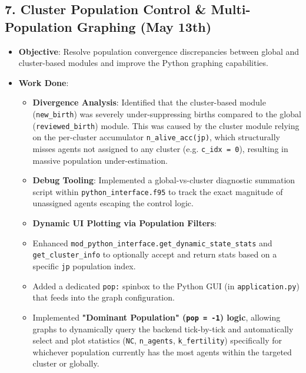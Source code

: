 \subsection{7. Cluster Population Control \& Multi-Population Graphing (May 13th)}
\begin{itemize}
\item \textbf{Objective}: Resolve population convergence discrepancies between global and cluster-based modules and improve the Python graphing capabilities.
\item \textbf{Work Done}:
\begin{itemize}
\item \textbf{Divergence Analysis}: Identified that the cluster-based module (\texttt{new\_birth}) was severely under-suppressing births compared to the global (\texttt{reviewed\_birth}) module. This was caused by the cluster module relying on the per-cluster accumulator \texttt{n\_alive\_acc(jp)}, which structurally misses agents not assigned to any cluster (e.g. \texttt{c\_idx = 0}), resulting in massive population under-estimation.
\item \textbf{Debug Tooling}: Implemented a global-vs-cluster diagnostic summation script within \texttt{python\_interface.f95} to track the exact magnitude of unassigned agents escaping the control logic.
\item \textbf{Dynamic UI Plotting via Population Filters}:
\item Enhanced \texttt{mod\_python\_interface.get\_dynamic\_state\_stats} and \texttt{get\_cluster\_info} to optionally accept and return stats based on a specific \texttt{jp} population index.
\item Added a dedicated \texttt{pop:} spinbox to the Python GUI (in \texttt{application.py}) that feeds into the graph configuration.
\item Implemented \textbf{"Dominant Population" (\texttt{pop = -1}) logic}, allowing graphs to dynamically query the backend tick-by-tick and automatically select and plot statistics (\texttt{NC}, \texttt{n\_agents}, \texttt{k\_fertility}) specifically for whichever population currently has the most agents within the targeted cluster or globally.
\end{itemize}
\end{itemize}

